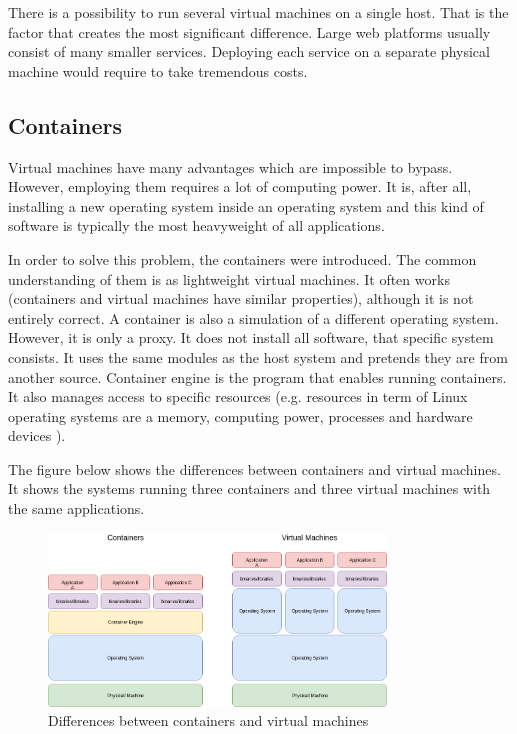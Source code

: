 There is a possibility to run several virtual machines on a single host. That is the factor that creates the most significant difference. Large web platforms usually consist of many smaller services. Deploying each service on a separate physical machine would require to take tremendous costs.

\subsection{Containers}
\label{subsec:containers}

Virtual machines have many advantages which are impossible to bypass. However, employing them requires a lot of computing power. It is, after all, installing a new operating system inside an operating system and this kind of software is typically the most heavyweight of all applications. 

In order to solve this problem, the containers were introduced. The common understanding of them is as lightweight virtual machines. It often works (containers and virtual machines have similar properties), although it is not entirely correct. A container is also a simulation of a different operating system. However, it is only a proxy. It does not install all software, that specific system consists. It uses the same modules as the host system and pretends they are from another source. Container engine is the program that enables running containers. It also manages access to specific resources (e.g. resources in term of Linux operating systems are a memory, computing power, processes and hardware devices \cite{kernel-anatomy}). 

The figure below shows the differences between containers and virtual machines. It shows the systems running three containers and three virtual machines with the same applications.

\begin{figure}[h!]
 \centering
  \includegraphics[width=0.8\textwidth]{pictures/containers-vs-vms.png}
  \caption{Differences between containers and virtual machines}
  \label{fig:load-balancing}
\end{figure}


